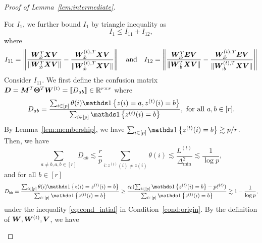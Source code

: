 \documentclass[lettersize,journal]{IEEEtran}
\theoremstyle{definition}
\theoremstyle{definition}
\newcommand{\of}[1]{\left(#1\right)}
\newcommand{\offf}[1]{\left\{#1\right\}}
\begin{document}
\begin{proof}[Proof of Lemma~\ref{lem:intermediate}]
\begin{enumerate}
    For $I_1$, we further bound $I_1$ by triangle inequality as
    \begin{equation}
        I_1 \leq I_{11} + I_{12},
    \end{equation}
    where
     \begin{equation}
        I_{11} = \left\lVert \frac{ \bm{W}_{:b}^T \bm X \bm{V}  }{\lVert  \bm{W}_{:b}^T \bm X \bm{V} \rVert} - \frac{ \bm{W}_{:b}^{(t), T} \bm X \bm{V}  }{ \lVert\bm{W}_{:b}^{(t), T} \bm X \bm{V} \rVert}   \right\rVert \quad \text{and} \quad I_{12} = \left\lVert \frac{\bm{W}_{:b}^T \bm{E} \bm{V}}{ \lVert  \bm{W}_{:b}^T \bm X \bm{V} \rVert} - \frac{\bm{W}_{:b}^{(t),T} \bm{E} \bm{V}}{ \lVert  \bm{W}_{:b}^{(t),T} \bm X \bm{V} \rVert} \right\rVert
    \end{equation}
    Consider $I_{11}$. We first define the confusion matrix $\bm{D} = \bm M^T \boldsymbol{\Theta}^T \bm{W}^{(t)} = \llbracket D_{ab} \rrbracket \in \mathbb{R}^{r \times r}$ where 
    \begin{equation}
        D_{ab} = \frac{\sum_{i \in [p]}  \theta(i) \ind \offf{ z(i) = a, z^{(t)}(i) = b } }{\sum_{i \in [p]}  \ind\offf{  z^{(t)}(i) = b }}, \text{  for all } a, b \in [r].
    \end{equation}
    By Lemma~\ref{lem:membership},  we have $\sum_{i \in [p]}  \ind\offf{  z^{(t)}(i) = b } \gtrsim p/r$. Then, we have
    \begin{equation}\label{eq:dab_bound}
        \sum_{a \neq b, a,b \in [r]} D_{ab} \lesssim \frac{r}{p} \sum_{i \colon z^{(t)}(i) \neq z(i)} \theta(i) \lesssim\frac{L^{(t)}}{\Delta_{\min}^2}  \lesssim \frac{1}{\log p}, 
    \end{equation}
    and for all $b \in [r]$
    \begin{equation}\label{eq:dbb_bound}
        D_{bb} = \frac{\sum_{i \in [p]}  \theta(i) \ind \offf{ z(i) = z^{(t)}(i) = b } }{\sum_{i \in [p]}  \ind\offf{  z^{(t)}(i) = b }} \geq \frac{c_0(\sum_{i \in [p]}  \ind\offf{  z^{(t)}(i) = b } - p\ell^{(t)})}{\sum_{i \in [p]}  \ind\offf{  z^{(t)}(i) = b }} \gtrsim 1 - \frac{1}{\log p},
    \end{equation}
    under the inequality \eqref{eq:cond_intial} in Condition~\ref{cond:origin}. By the definition of $\bm{W},\bm{W}^{(t)},\bm{V}$, we have 

\end{enumerate}
\end{proof}
\end{document}
